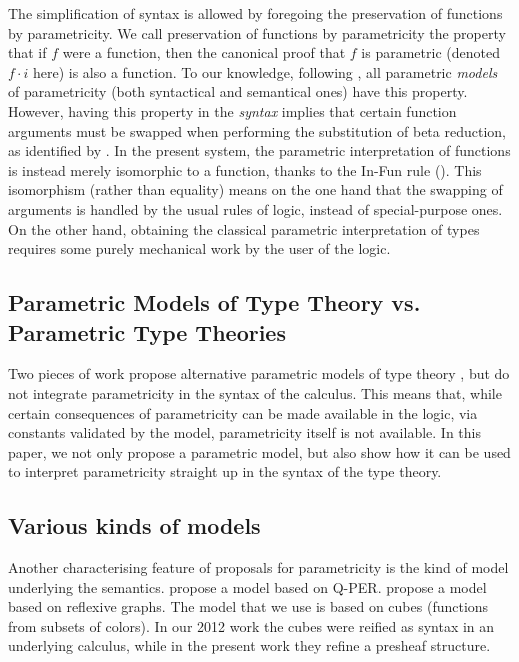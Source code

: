 \documentclass[english]{PaperTools/latex/lipics}
\newcommand\param[1]{\!\cdot\!#1}
\begin{document}
The simplification of syntax is allowed by foregoing the preservation
of functions by parametricity. We call preservation of functions by
parametricity the property that if $f$ were a function, then the
canonical proof that $f$ is parametric (denoted $f \param i$ here) is
also a function. To our knowledge, following \citet{reynolds_types_1983}, all parametric \emph{models} of parametricity (both syntactical and semantical ones) have this property.
However, having this property in the \emph{syntax} implies that
certain function arguments must be swapped when performing the
substitution of beta reduction, as identified by
\citet{bernardy_computational_2012}.  In the present system, the
parametric interpretation of functions is instead merely isomorphic to
a function, thanks to the {\sc In-Fun} rule (). This
isomorphism (rather than equality) means on the one hand that the
swapping of arguments is handled by the usual rules of logic, instead
of special-purpose ones. On the other hand, obtaining the classical
parametric interpretation of types requires some purely mechanical
work by the user of the logic.

\subsection{Parametric Models of Type Theory vs. Parametric Type Theories}

Two pieces of work propose alternative parametric models of
type theory
\citep{atkey_relationally_2014,krishnaswami_internalizing_2013}, but
do not integrate parametricity in the syntax of the calculus. This
means that, while certain consequences of parametricity can be made
available in the logic, via constants validated by the model,
parametricity itself is not available. In this paper, we not only
propose a parametric model, but also show how it can be used to
interpret parametricity straight up in the syntax of the type theory.


\subsection{Various kinds of models}
Another characterising feature of proposals for parametricity is the
kind of model underlying the
semantics.  propose a model
based on Q-PER.  propose a model based
on reflexive graphs. The model that we use is based on cubes
(functions from subsets of colors). In
our 2012 work the cubes were reified as syntax in
an underlying calculus, while in the present work they refine a presheaf structure.
\end{document}
